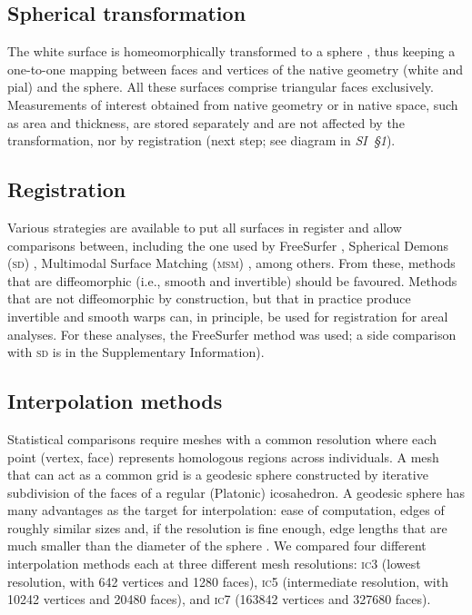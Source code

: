 \subsection{Spherical transformation}

The white surface is homeomorphically transformed to a sphere \citep{Fischl1999_intersubject}, thus keeping a one-to-one mapping between faces and vertices of the native geometry (white and pial) and the sphere. All these surfaces comprise triangular faces exclusively. Measurements of interest obtained from native geometry or in native space, such as area and thickness, are stored separately and are not affected by the transformation, nor by registration (next step; see diagram in \emph{SI~§1}).

\subsection{Registration}

Various strategies are available to put all surfaces in register and allow comparisons between, including the one used by FreeSurfer \citep{Fischl1999_intersubject}, Spherical Demons (\textsc{sd}) \citep{Yeo2010}, Multimodal Surface Matching (\textsc{msm}) \citep{Robinson2014}, among others. From these, methods that are diffeomorphic (i.e., smooth and invertible) should be favoured. Methods that are not diffeomorphic by construction, but that in practice produce invertible and smooth warps can, in principle, be used for registration for areal analyses. For these analyses, the FreeSurfer method was used; a side comparison with \textsc{sd} is in the Supplementary Information).

\subsection{Interpolation methods}

Statistical comparisons require meshes with a common resolution where each point (vertex, face) represents homologous regions across individuals. A mesh that can act as a common grid is a geodesic sphere constructed by iterative subdivision of the faces of a regular (Platonic) icosahedron. A geodesic sphere has many advantages as the target for interpolation: ease of computation, edges of roughly similar sizes and, if the resolution is fine enough, edge lengths that are much smaller than the diameter of the sphere \citep{Kenner1976}. We compared four different interpolation methods each at three different mesh resolutions: \textsc{ic}3 (lowest resolution, with 642 vertices and 1280 faces), \textsc{ic}5 (intermediate resolution, with 10242 vertices and 20480 faces),  and \textsc{ic}7 (163842 vertices and 327680 faces).

